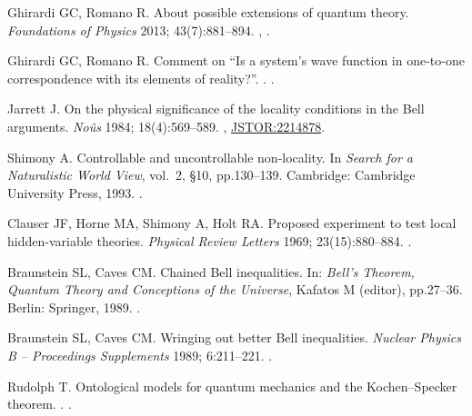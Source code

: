 \documentclass[DIV=calc,fontsize=12pt]{scrartcl} %
\theoremstyle{definition}
\theoremstyle{plain}
\begin{document}
\begin{thebibliography}{10}
Ghirardi GC, Romano R.
\newblock About possible extensions of quantum theory.
\newblock \emph{Foundations of Physics} 2013; 43(7):881--894.
\newblock \href {http://arxiv.org/abs/1301.5040} {},
\href {http://dx.doi.org/10.1007/s10701-013-9724-6}
{}.

Ghirardi GC, Romano R.
\newblock Comment on ``Is a system's wave function in one-to-one correspondence with its elements of reality?''.
.
\newblock \href {http://arxiv.org/abs/1302.1635} {}.

Jarrett J.
\newblock On the physical significance of the locality conditions in the {B}ell
arguments.
\newblock \emph{No{\^u}s} 1984; 18(4):569--589.
\newblock \href {http://dx.doi.org/10.2307/2214878}{},
\newblock \href{http://www.jstor.org/stable/2214878}{JSTOR:2214878}.

Shimony A.
\newblock Controllable and uncontrollable non-locality.
\newblock In \emph{{Search for a Naturalistic World View}}, vol.~2,
\S 10, pp.130--139. Cambridge: Cambridge University Press, 1993.
\newblock \href {http://dx.doi.org/10.1017/CBO9781139172196.010}{}.

Clauser JF, Horne MA, Shimony A, Holt RA.
\newblock Proposed experiment to test local hidden-variable theories.
\newblock \emph{Physical Review Letters} 1969; 23(15):880--884.
\newblock \href {http://dx.doi.org/10.1103/PhysRevLett.23.880}
{}.

Braunstein SL, Caves CM.
\newblock Chained Bell inequalities.
\newblock In: \emph{Bell's Theorem, Quantum Theory and Conceptions of the Universe}, Kafatos M (editor), pp.27--36. Berlin: Springer, 1989.
\newblock \href {http://dx.doi.org/10.1007/978-94-017-0849-4_5}
{}.

Braunstein SL, Caves CM.
\newblock Wringing out better Bell inequalities.
\newblock \emph{Nuclear Physics B -- Proceedings Supplements} 1989; 6:211--221.
\newblock \href{http://dx.doi.org/10.1016/0920-5632(89)90441-6}{}.

Rudolph T.
\newblock Ontological models for quantum mechanics and the Kochen--Specker theorem.
.
\newblock \href {http://arxiv.org/abs/quant-ph/0608120}
{}.


\end{thebibliography}
\end{document}
